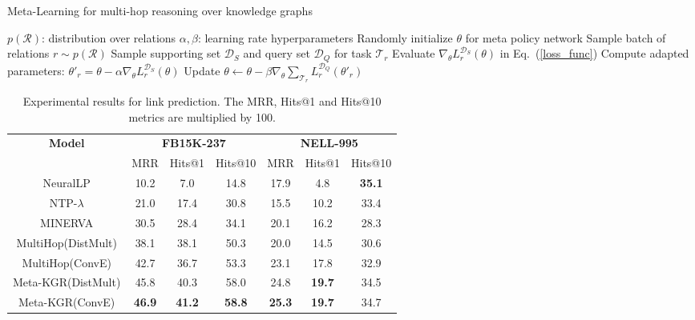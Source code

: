 \documentclass[11pt,a4paper]{article}
\begin{document}
\begin{algorithm}[t] 
\small
\caption{Meta-Learning for multi-hop reasoning over knowledge graphs} 
\label{algorithm-kgr}
\begin{algorithmic}[1] 
\Require 
$p(\mathcal{R})$: distribution over relations
\Require 
$\alpha, \beta$: learning rate hyperparameters
\State Randomly initialize $\theta$ for meta policy network
\State Sample batch of relations $r \sim p(\mathcal{R})$
\State Sample supporting set $\mathcal{D}_S$ and query set $\mathcal{D}_Q$ for task $\mathcal{T}_r$
\State Evaluate $\nabla_{\theta}L_r^{\mathcal{D}_S}(\theta)$ in Eq.~(\ref{loss_func})
\State Compute adapted parameters: $\theta'_r = \theta - \alpha \nabla_{\theta}L_r^{\mathcal{D}_S}(\theta)$
\EndFor
\State Update $\theta \leftarrow \theta - \beta \nabla_{\theta}\sum_{\mathcal{T}_r} L_r^{\mathcal{D}_Q} (\theta'_r)$
\EndWhile
\end{algorithmic} 
\end{algorithm}

\begin{table*}[t]
\small
\centering
\setlength{\belowcaptionskip}{-1pt}
    \begin{tabular}{c|ccc|ccc}
    \toprule
    \multirow{2}{*}{\textbf{Model}} & \multicolumn{3}{c|}{\textbf{FB15K-237}} & \multicolumn{3}{c}{\textbf{NELL-995}} \\
    & MRR & Hits@1 & Hits@10 & MRR & Hits@1 & Hits@10  \\
    \midrule
    NeuralLP  & 10.2  & 7.0  & 14.8   & 17.9  & 4.8 & \textbf{35.1}  \\
    NTP-$\lambda$  & 21.0  & 17.4 & 30.8   & 15.5  & 10.2 & 33.4  \\
    MINERVA  & 30.5  & 28.4  & 34.1   & 20.1  & 16.2 & 28.3  \\
    MultiHop(DistMult)  & 38.1  & 38.1  & 50.3   & 20.0  & 14.5 & 30.6  \\
    MultiHop(ConvE)  & 42.7  & 36.7  & 53.3   & 23.1  & 17.8 & 32.9  \\
    Meta-KGR(DistMult)  & 45.8  & 40.3  & 58.0   & 24.8  & \textbf{19.7} & 34.5  \\
    Meta-KGR(ConvE)  & \textbf{46.9}  & \textbf{41.2} & \textbf{58.8}   & \textbf{25.3}  & \textbf{19.7} & 34.7  \\
    \bottomrule
    \end{tabular}
    \caption{\label{table} Experimental results for link prediction. The MRR, Hits@1 and Hits@10 metrics are multiplied by 100.}
\end{table*}
\end{document}
